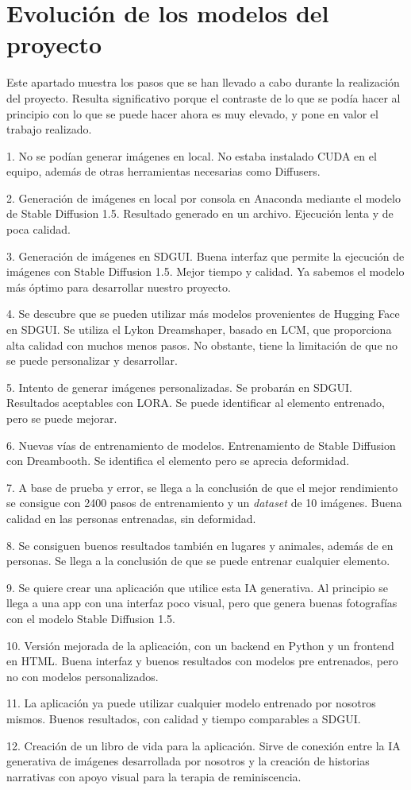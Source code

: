 \section{Evolución de los modelos del proyecto}

Este apartado muestra los pasos que se han llevado a cabo durante la realización del proyecto. Resulta significativo porque el contraste de lo que se podía hacer al principio con lo que se puede hacer ahora es muy elevado, y pone en valor el trabajo realizado.

1. No se podían generar imágenes en local. No estaba instalado CUDA en el equipo, además de otras herramientas necesarias como Diffusers.

2. Generación de imágenes en local por consola en Anaconda mediante el modelo de Stable Diffusion 1.5. Resultado generado en un archivo. Ejecución lenta y de poca calidad.

3. Generación de imágenes en SDGUI. Buena interfaz que permite la ejecución de imágenes con Stable Diffusion 1.5. Mejor tiempo y calidad. Ya sabemos el modelo más óptimo para desarrollar nuestro proyecto.

4. Se descubre que se pueden utilizar más modelos provenientes de Hugging Face en SDGUI. Se utiliza el Lykon Dreamshaper, basado en LCM, que proporciona alta calidad con muchos menos pasos. No obstante, tiene la limitación de que no se puede personalizar y desarrollar.

5. Intento de generar imágenes personalizadas. Se probarán en SDGUI. Resultados aceptables con LORA. Se puede identificar al elemento entrenado, pero se puede mejorar.

6. Nuevas vías de entrenamiento de modelos. Entrenamiento de Stable Diffusion con Dreambooth. Se identifica el elemento pero se aprecia deformidad.

7. A base de prueba y error, se llega a la conclusión de que el mejor rendimiento se consigue con 2400 pasos de entrenamiento y un \textit{dataset} de 10 imágenes. Buena calidad en las personas entrenadas, sin deformidad.

8. Se consiguen buenos resultados también en lugares y animales, además de en personas. Se llega a la conclusión de que se puede entrenar cualquier elemento.

9. Se quiere crear una aplicación que utilice esta IA generativa. Al principio se llega a una app con una interfaz poco visual, pero que genera buenas fotografías con el modelo Stable Diffusion 1.5.

10. Versión mejorada de la aplicación, con un backend en Python y un frontend en HTML. Buena interfaz y buenos resultados con modelos pre entrenados, pero no con modelos personalizados.

11. La aplicación ya puede utilizar cualquier modelo entrenado por nosotros mismos. Buenos resultados, con calidad y tiempo comparables a SDGUI.

12. Creación de un libro de vida para la aplicación. Sirve de conexión entre la IA generativa de imágenes desarrollada por nosotros y la creación de historias narrativas con apoyo visual para la terapia de reminiscencia.